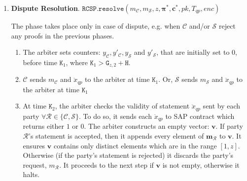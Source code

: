 \begin{enumerate}
\

\item \textbf{Dispute Resolution}.\label{RCSP::Dispute-Resolution} $\mathtt{RCSP}.\mathtt{resolve}(m_{\scriptscriptstyle \mathcal{C}},m_{\scriptscriptstyle \mathcal{S}}, z, {\bm{\pi}}^{\scriptscriptstyle *}, {\bm{c}}^{\scriptscriptstyle *}, pk, T_{\scriptscriptstyle qp},enc)$



 The phase takes place only in  case of dispute, e.g. when $\mathcal C$ and/or $\mathcal S$ reject any proofs in the previous phases. %

\begin{enumerate}


\item The arbiter sets  counters: $y_{\scriptscriptstyle\mathcal C}, y'_{\scriptscriptstyle\mathcal C},y_{\scriptscriptstyle\mathcal S}$ and  $y'_{\scriptscriptstyle\mathcal S}$, that are initially set to $0$,  before time $\texttt{K}_{\scriptscriptstyle 1}$,  where $\texttt{K}_{\scriptscriptstyle 1}>\texttt{G}_{\scriptscriptstyle z,2}+\texttt{H}$. 
\item $\mathcal C$  sends $m_{\scriptscriptstyle\mathcal C}$ and $\ddot{x}_{\scriptscriptstyle qp}$ to the arbiter at time $\texttt{K}_{\scriptscriptstyle 1}$. Or,  $\mathcal S$ sends $m_{\scriptscriptstyle\mathcal S}$ and $\ddot{x}_{\scriptscriptstyle qp}$ to the arbiter at time $\texttt{K}_{\scriptscriptstyle 1}$ %


\item\label{arbiter-checks-statement} At time $\texttt{K}_{\scriptscriptstyle 2}$, the arbiter checks the validity of  statement $\ddot{x}_{\scriptscriptstyle qp}$ sent by each party  $\forall \mathcal R\in \{\mathcal {C,S}\}$. To  do so, it sends  each $\ddot{x}_{\scriptscriptstyle qp}$ to SAP contract which  returns  either $1$ or $0$. The arbiter  constructs an empty vector: $\bm{v}$.  If  party $\mathcal R$'s statement is accepted, then 
 it appends every  element of $\bm{m}_{\scriptscriptstyle\mathcal{R}}$ to $\bm{v}$. It ensures $\bm{v}$ contains only distinct elements which are in the range $[1,z]$. Otherwise (if the party's statement is rejected) it discards the party's request, ${m}_{\scriptscriptstyle\mathcal{R}}$. It proceeds to the next step if $\bm{v}$ is not empty, otherwise it halts. 


\end{enumerate}
\end{enumerate}
